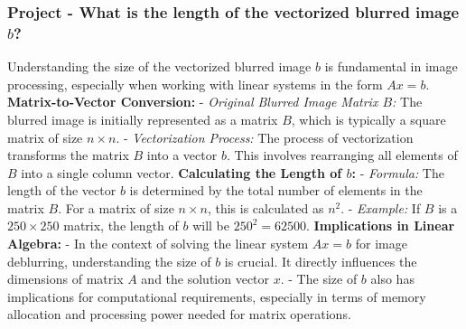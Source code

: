 \documentclass[unicode,11pt,a4paper,oneside,numbers=endperiod,openany]{scrartcl}
\begin{document}
\subsubsection{Project - What is the length of the vectorized blurred image $b$?}
Understanding the size of the vectorized blurred image \( b \) is fundamental in image processing, especially when working with linear systems in the form \( Ax = b \).
\newline
\textbf{Matrix-to-Vector Conversion:}
- \textit{Original Blurred Image Matrix \( B \):} The blurred image is initially represented as a matrix \( B \), which is typically a square matrix of size \( n \times n \).
- \textit{Vectorization Process:} The process of vectorization transforms the matrix \( B \) into a vector \( b \). This involves rearranging all elements of \( B \) into a single column vector.
\newline
\textbf{Calculating the Length of \( b \):}
- \textit{Formula:} The length of the vector \( b \) is determined by the total number of elements in the matrix \( B \). For a matrix of size \( n \times n \), this is calculated as \( n^2 \).
- \textit{Example:} If \( B \) is a \( 250 \times 250 \) matrix, the length of \( b \) will be \( 250^2 = 62500 \).
\newline
\textbf{Implications in Linear Algebra:}
- In the context of solving the linear system \( Ax = b \) for image deblurring, understanding the size of \( b \) is crucial. It directly influences the dimensions of matrix \( A \) and the solution vector \( x \).
- The size of \( b \) also has implications for computational requirements, especially in terms of memory allocation and processing power needed for matrix operations.
\newline\newline
\end{document}
